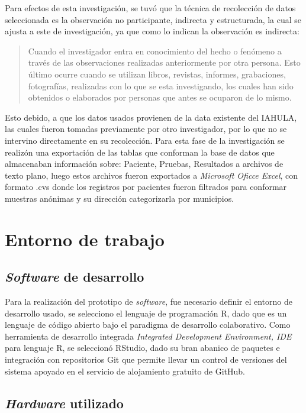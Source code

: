 Para efectos de esta investigaci\'on, se tuv\'o que la t\'ecnica de recolecci\'on de datos seleccionada es la observaci\'on no participante, indirecta y estructurada, la cual se ajusta a este de investigaci\'on, ya que como lo indican \citet{pallela} la observaci\'on es indirecta:

\begin{quote}
Cuando el investigador entra en conocimiento del hecho o fen\'omeno a trav\'es de las observaciones realizadas anteriormente por otra persona. Esto \'ultimo ocurre cuando se utilizan libros, revistas, informes, grabaciones, fotograf\'ias, realizadas con lo que se esta investigando, los cuales han sido obtenidos o elaborados por personas que antes se ocuparon de lo mismo.
\end{quote}

Esto debido, a que los datos usados provienen de la data existente del IAHULA, las cuales fueron tomadas previamente por otro investigador, por lo que no se intervino directamente en su recolecci\'on. Para esta fase de la investigaci\'on se realiz\'on una exportaci\'on de las tablas que conforman la base de datos que almacenaban informaci\'on sobre: Paciente, Pruebas, Resultados a archivos de texto plano, luego estos archivos fueron exportados a \textit{Microsoft Oficce Excel}, con formato .cvs donde los registros por pacientes fueron filtrados para conformar muestras an\'onimas y su direcci\'on categorizarla por municipios.
\section{Entorno de trabajo}

\subsection{\textit{Software} de desarrollo}

Para la realizaci\'on del prototipo de \textit{software}, fue necesario definir el entorno de desarrollo usado, se selecciono el lenguaje de programaci\'on R, dado que es un lenguaje de c\'odigo abierto bajo el paradigma de desarrollo colaborativo.  Como  herramienta de desarrollo integrada \textit{Integrated Development Environment, IDE} para lenguaje  R, se seleccion\'o  RStudio, dado su bran abanico de paquetes e integraci\'on con repositorios Git  que permite llevar  un control de versiones del sistema apoyado en el servicio de alojamiento gratuito de GitHub.

\subsection{\textit{Hardware} utilizado}

